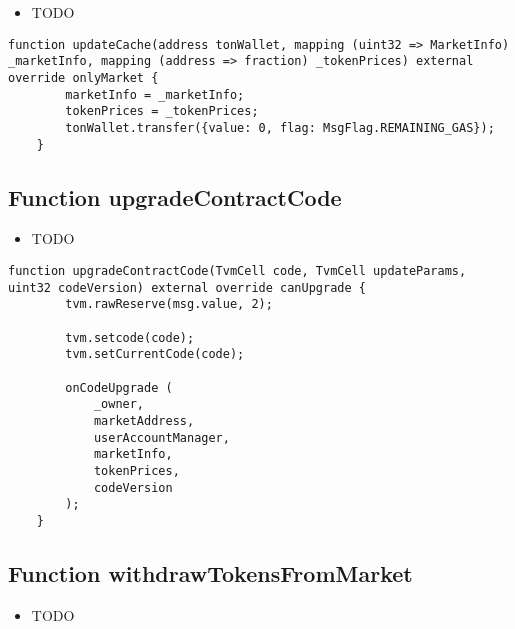 \noindent\begin{itemize}
\item TODO
\end{itemize}

\begin{lstlisting}[firstnumber=83]
    function updateCache(address tonWallet, mapping (uint32 => MarketInfo) _marketInfo, mapping (address => fraction) _tokenPrices) external override onlyMarket {
        marketInfo = _marketInfo;
        tokenPrices = _tokenPrices;
        tonWallet.transfer({value: 0, flag: MsgFlag.REMAINING_GAS});
    }
\end{lstlisting}

\subsection{Function upgradeContractCode}

\noindent\begin{itemize}
\item TODO
\end{itemize}

\begin{lstlisting}[firstnumber=25]
    function upgradeContractCode(TvmCell code, TvmCell updateParams, uint32 codeVersion) external override canUpgrade {
        tvm.rawReserve(msg.value, 2);

        tvm.setcode(code);
        tvm.setCurrentCode(code);

        onCodeUpgrade (
            _owner,
            marketAddress,
            userAccountManager,
            marketInfo,
            tokenPrices,
            codeVersion
        );
    }
\end{lstlisting}

\subsection{Function withdrawTokensFromMarket}

\noindent\begin{itemize}
\item TODO
\end{itemize}

